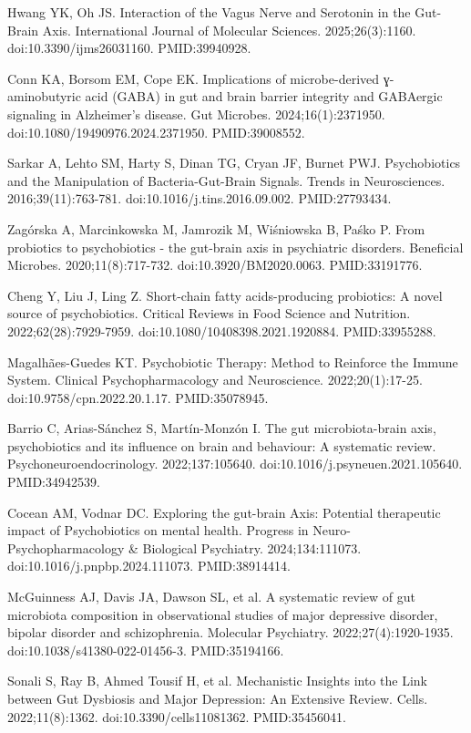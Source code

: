 \documentclass[12pt,oneside]{book}
\newcommand{\reff}[2]{\par\hangindent=7mm\hangafter=1\noindent[#1]\hspace{2mm}#2\par}
\begin{document}
\reff{31}{Hwang YK, Oh JS. Interaction of the Vagus Nerve and Serotonin in the Gut-Brain Axis. International Journal of Molecular Sciences. 2025;26(3):1160. doi:10.3390/ijms26031160. PMID:39940928.}

\reff{32}{Conn KA, Borsom EM, Cope EK. Implications of microbe-derived ɣ-aminobutyric acid (GABA) in gut and brain barrier integrity and GABAergic signaling in Alzheimer's disease. Gut Microbes. 2024;16(1):2371950. doi:10.1080/19490976.2024.2371950. PMID:39008552.}

\reff{33}{Sarkar A, Lehto SM, Harty S, Dinan TG, Cryan JF, Burnet PWJ. Psychobiotics and the Manipulation of Bacteria-Gut-Brain Signals. Trends in Neurosciences. 2016;39(11):763-781. doi:10.1016/j.tins.2016.09.002. PMID:27793434.}

\reff{34}{Zagórska A, Marcinkowska M, Jamrozik M, Wiśniowska B, Paśko P. From probiotics to psychobiotics - the gut-brain axis in psychiatric disorders. Beneficial Microbes. 2020;11(8):717-732. doi:10.3920/BM2020.0063. PMID:33191776.}

\reff{35}{Cheng Y, Liu J, Ling Z. Short-chain fatty acids-producing probiotics: A novel source of psychobiotics. Critical Reviews in Food Science and Nutrition. 2022;62(28):7929-7959. doi:10.1080/10408398.2021.1920884. PMID:33955288.}

\reff{36}{Magalhães-Guedes KT. Psychobiotic Therapy: Method to Reinforce the Immune System. Clinical Psychopharmacology and Neuroscience. 2022;20(1):17-25. doi:10.9758/cpn.2022.20.1.17. PMID:35078945.}

\reff{37}{Barrio C, Arias-Sánchez S, Martín-Monzón I. The gut microbiota-brain axis, psychobiotics and its influence on brain and behaviour: A systematic review. Psychoneuroendocrinology. 2022;137:105640. doi:10.1016/j.psyneuen.2021.105640. PMID:34942539.}

\reff{38}{Cocean AM, Vodnar DC. Exploring the gut-brain Axis: Potential therapeutic impact of Psychobiotics on mental health. Progress in Neuro-Psychopharmacology \& Biological Psychiatry. 2024;134:111073. doi:10.1016/j.pnpbp.2024.111073. PMID:38914414.}

\reff{39}{McGuinness AJ, Davis JA, Dawson SL, et al. A systematic review of gut microbiota composition in observational studies of major depressive disorder, bipolar disorder and schizophrenia. Molecular Psychiatry. 2022;27(4):1920-1935. doi:10.1038/s41380-022-01456-3. PMID:35194166.}

\reff{40}{Sonali S, Ray B, Ahmed Tousif H, et al. Mechanistic Insights into the Link between Gut Dysbiosis and Major Depression: An Extensive Review. Cells. 2022;11(8):1362. doi:10.3390/cells11081362. PMID:35456041.}
\end{document}
